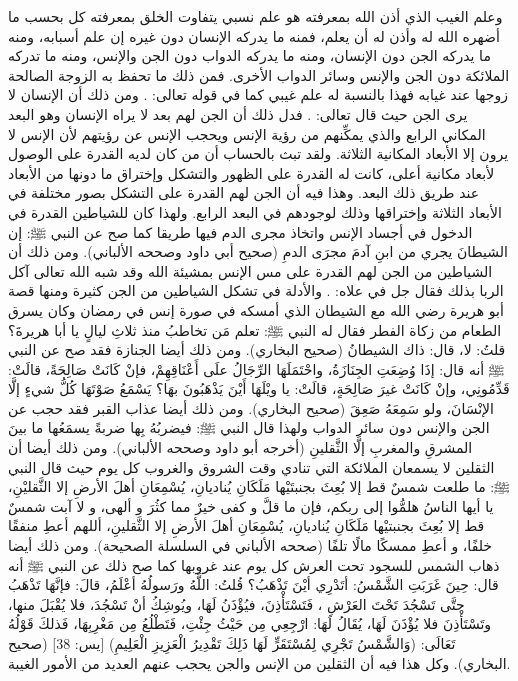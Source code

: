 وعلم الغيب الذي أذن الله بمعرفته هو علم نسبي يتفاوت الخلق بمعرفته كل بحسب ما أضهره الله له وأذن له أن يعلم، فمنه ما يدركه الإنسان دون غيره إن علم أسبابه، ومنه ما يدركه الجن دون الإنسان، ومنه ما يدركه الدواب دون الجن والإنس، ومنه ما تدركه الملائكة دون الجن والإنس وسائر الدواب الأخرى. فمن ذلك ما تحفظ به الزوجة الصالحة زوجها عند غيابه فهذا بالنسبة له علم غيبي كما في قوله تعالى: \quranayah*[4][34][15-21] {\footnotesize (\surahname*[4])}. ومن ذلك أن الإنسان لا يرى الجن حيث قال تعالى: \quranayah*[7][27][17-24] {\footnotesize (\surahname*[7])}. فدل ذلك أن الجن لهم بعد لا يراه الإنسان وهو البعد المكاني الرابع والذي يمكِّنهم من رؤية الإنس ويحجب الإنس عن رؤيتهم لأن الإنس لا يرون إلا الأبعاد المكانية الثلاثة. ولقد تبث بالحساب أن من كان لديه القدرة على الوصول لأبعاد مكانية أعلى، كانت له القدرة على الظهور والتشكل وإختراق ما دونها من الأبعاد عند طريق ذلك البعد. وهذا فيه أن الجن لهم القدرة على التشكل بصور مختلفة في الأبعاد الثلاثة وإختراقها وذلك لوجودهم في البعد الرابع. ولهذا كان للشياطين القدرة في الدخول في أجساد الإنس واتخاذ مجرى الدم فيها طريقا كما صح عن النبي ﷺ: إن الشيطانَ يجري من ابنِ آدمَ مجرَى الدمِ {\footnotesize (صحيح أبي داود وصححه الألباني)}. ومن ذلك أن الشياطين من الجن لهم القدرة على مس الإنس بمشيئة الله وقد شبه الله تعالى آكل الربا بذلك فقال جل في علاه: \quranayah*[2][275][1-13] {\footnotesize (\surahname*[2])}. والأدلة في تشكل الشياطين من الجن كثيرة ومنها قصة أبو هريرة رضي الله مع الشيطان الذي أمسكه في صورة إنس في رمضان وكان يسرق الطعام من زكاة الفطر فقال له النبي ﷺ: تعلم مَن تخاطبُ منذ ثلاثِ ليالٍ يا أبا هريرةَ؟ قلتُ: لا، قال: ذاك الشيطانُ {\footnotesize (صحيح البخاري)}. ومن ذلك أيضا الجنازة فقد صح عن النبي ﷺ أنه قال: إذَا وُضِعَتِ الجِنَازَةُ، واحْتَمَلَهَا الرِّجَالُ علَى أَعْنَاقِهِمْ، فإنْ كَانَتْ صَالِحَةً، قالَتْ: قَدِّمُونِي، وإنْ كَانَتْ غيرَ صَالِحَةٍ، قالَتْ: يا ويْلَهَا أَيْنَ يَذْهَبُونَ بهَا؟ يَسْمَعُ صَوْتَهَا كُلُّ شيءٍ إلَّا الإنْسَانَ، ولو سَمِعَهُ صَعِقَ {\footnotesize (صحيح البخاري)}. ومن ذلك أيضا عذاب القبر فقد حجب عن الجن والإنس دون سائر الدواب ولهذا قال النبي ﷺ: فيضربُهُ بِها ضربةً يسمَعُها ما بينَ المشرقِ والمغربِ إلَّا الثَّقلينِ {\footnotesize (أخرجه أبو داود وصححه الألباني)}. ومن ذلك أيضا أن الثقلين لا يسمعان الملائكة التي تنادي وقت الشروق والغروب كل يوم حيث قال النبي ﷺ: ما طلعت شمسٌ قط إلا بُعِثَ بجنبتَيْها مَلَكَانِ يُناديانِ، يُسْمِعَانِ أهلَ الأرضِ إلا الثَّقليْنِ، يا أيها الناسُ هلمُّوا إلى ربكم، فإن ما قلَّ و كفى خيرٌ مما كثُرَ و ألهى، و لا آبت شمسٌ قط إلا بُعِثَ بجنبتيْها مَلَكَانِ يُناديانِ، يُسْمِعَانِ أهلَ الأرضِ إلا الثَّقلينِ، أللهم أعطِ منفقًا خلفًا، و أعطِ ممسكًا مالًا تلفًا {\footnotesize (صححه الألباني في السلسلة الصحيحة)}. ومن ذلك أيضا ذهاب الشمس للسجود تحت العرش كل يوم عند غروبها كما صح ذلك عن النبي ﷺ أنه قال: حِينَ غَرَبَتِ الشَّمْسُ: أتَدْرِي أيْنَ تَذْهَبُ؟ قُلتُ: اللَّهُ ورَسولُهُ أعْلَمُ، قالَ: فإنَّهَا تَذْهَبُ حتَّى تَسْجُدَ تَحْتَ العَرْشِ ، فَتَسْتَأْذِنَ، فيُؤْذَنُ لَهَا، ويُوشِكُ أنْ تَسْجُدَ، فلا يُقْبَلَ منها، وتَسْتَأْذِنَ فلا يُؤْذَنَ لَهَا، يُقَالُ لَهَا: ارْجِعِي مِن حَيْثُ جِئْتِ، فَتَطْلُعُ مِن مَغْرِبِهَا، فَذلكَ قَوْلُهُ تَعَالَى: (وَالشَّمْسُ تَجْرِي لِمُسْتَقَرٍّ لَهَا ذَلِكَ تَقْدِيرُ الْعَزِيزِ الْعَلِيمِ) [يس: 38] {\footnotesize (صحيح البخاري)}. وكل هذا فيه أن الثقلين من الإنس والجن يحجب عنهم العديد من الأمور الغيبة.

